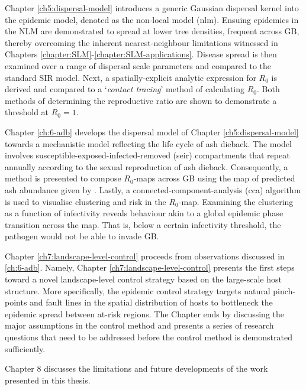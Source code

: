 Chapter \ref{ch5:dispersal-model} introduces a generic Gaussian dispersal kernel into the epidemic model, denoted as the non-local model (\acrshort{nlm}). 
Ensuing epidemics in the NLM are demonstrated to spread at lower tree densities, frequent across GB, thereby overcoming the inherent nearest-neighbour limitations witnessed in Chapters \ref{chapter:SLM}-\ref{chapter:SLM-applications}.
Disease spread is then examined over a range of dispersal scale parameters and compared to the standard SIR model. Next, a spatially-explicit analytic expression for $R_0$ is derived and compared to a `\textit{contact tracing}' method of calculating $R_0$.
Both methods of determining the reproductive ratio are shown to demonstrate a threshold at $R_0=1$.

Chapter \ref{ch:6-adb} develops the dispersal model of Chapter \ref{ch5:dispersal-model} towards a mechanistic model reflecting the life cycle of ash dieback. The model involves susceptible-exposed-infected-removed (\acrshort{seir}) compartments that repeat annually according to the sexual reproduction of ash dieback. Consequently, a method is presented to compose $R_0$-maps
across GB using the map of predicted ash abundance given by \cite{hill.data}. Lastly, a connected-component-analysis
(\acrshort{cca}) algorithm is used to visualise  clustering and risk in the $R_0$-map. Examining the clustering as a function
of infectivity reveals behaviour akin to a global epidemic phase transition across the map. That is, below a certain infectivity threshold, 
the pathogen would not be able to invade GB.

Chapter \ref{ch7:landscape-level-control} proceeds from observations discussed in \ref{ch:6-adb}. 
Namely, Chapter \ref{ch7:landscape-level-control} presents the first steps toward a novel landscape-level
control strategy based on the large-scale host structure. More specifically, the epidemic control strategy targets
natural pinch-points and fault lines in the spatial distribution of hosts to bottleneck the epidemic
spread between at-risk regions. The Chapter ends by discussing the major assumptions in the control method and presents
a series of research questions that need to be addressed before the control method is demonstrated sufficiently.

Chapter 8 discusses the limitations and future developments of the work presented in this thesis.